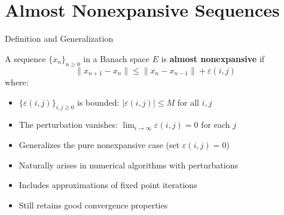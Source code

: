 \documentclass[aspectratio=169,10pt]{beamer}
\begin{document}
\section{Almost Nonexpansive Sequences}

\begin{frame}{Definition and Generalization}
    \begin{definition}
        A sequence $\{x_n\}_{n \geq 0}$ in a Banach space $E$ is \textbf{almost nonexpansive} if
        \[
        \|x_{n+1} - x_n\| \leq \|x_n - x_{n-1}\| + \varepsilon(i,j)
        \]
        where:
        \begin{itemize}
            \item $\{\varepsilon(i,j)\}_{i,j \geq 0}$ is bounded: $|\varepsilon(i,j)| \leq M$ for all $i, j$
            \item The perturbation vanishes: $\lim_{i \to \infty} \varepsilon(i,j) = 0$ for each $j$
        \end{itemize}
    \end{definition}

    \vspace{0.5cm}

    \begin{remark}
        \begin{itemize}
            \item Generalizes the pure nonexpansive case (set $\varepsilon(i,j) = 0$)
            \item Naturally arises in numerical algorithms with perturbations
            \item Includes approximations of fixed point iterations
            \item Still retains good convergence properties
        \end{itemize}
    \end{remark}
\end{frame}
\end{document}
